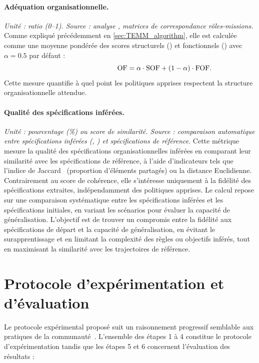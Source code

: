 \paragraph{Adéquation organisationnelle.}
\textit{Unité : ratio (0–1). Source : analyse , matrices de correspondance rôles-missions.}
Comme expliqué précédemment en \autoref{sec:TEMM_algorithm}, elle est calculée comme une moyenne pondérée des scores structurels () et fonctionnels () avec $\alpha = 0.5$ par défaut :
\[
  \hspace{3.5cm}\text{OF} = \alpha \cdot \text{SOF} + (1-\alpha) \cdot \text{FOF}.
\]
Cette mesure quantifie à quel point les politiques apprises respectent la structure organisationnelle attendue.

\paragraph{Qualité des spécifications inférées.}
\textit{Unité : pourcentage (\%) ou score de similarité. Source : comparaison automatique entre spécifications inférées (, ) et spécifications de référence}.
Cette métrique mesure la qualité des spécifications organisationnelles inférées en comparant leur similarité avec les spécifications de référence, à l'aide d'indicateurs tels que l'indice de Jaccard~\cite{Jaccard1908} (proportion d'éléments partagés) ou la distance Euclidienne. Contrairement au score de cohérence, elle s'intéresse uniquement à la fidélité des spécifications extraites, indépendamment des politiques apprises. Le calcul repose sur une comparaison systématique entre les spécifications inférées et les spécifications initiales, en variant les scénarios pour évaluer la capacité de généralisation. L'objectif est de trouver un compromis entre la fidélité aux spécifications de départ et la capacité de généralisation, en évitant le surapprentissage et en limitant la complexité des règles ou objectifs inférés, tout en maximisant la similarité avec les trajectoires de référence.

\section{Protocole d'expérimentation et d'évaluation}\label{sec:protocole_experimental}

Le protocole expérimental proposé suit un raisonnement progressif semblable aux pratiques de la communauté~\cite{papoudakis2021agent}.
L'ensemble des étapes 1 à 4 constitue le protocole d'expérimentation tandis que les étapes 5 et 6 concernent l'évaluation des résultats :

